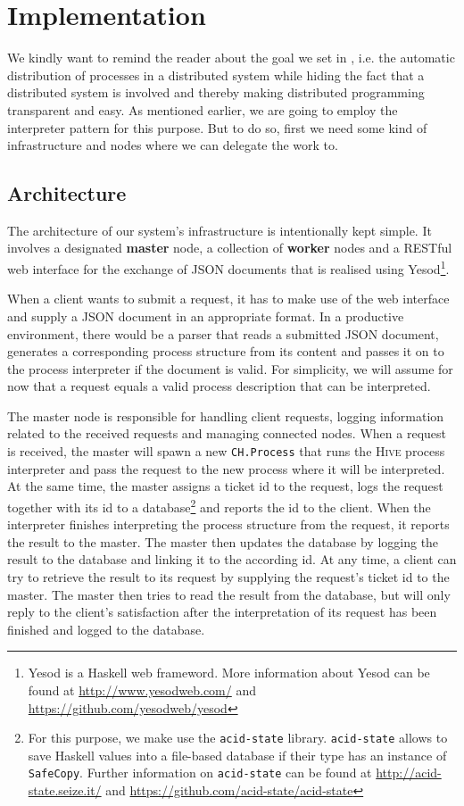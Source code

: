\section{Implementation}
\label{chp:implementation}
We kindly want to remind the reader about the goal we set in , i.e. the automatic distribution of processes in a distributed system while hiding the fact that a distributed system is involved and thereby making distributed programming transparent and easy. As mentioned earlier, we are going to employ the interpreter pattern \cite{Gamma:1995:DPE:186897} for this purpose. But to do so, first we need some kind of infrastructure and nodes where we can delegate the work to.

\subsection{Architecture}
The architecture of our system's infrastructure is intentionally kept simple. It involves a designated \textbf{master} node, a collection of \textbf{worker} nodes and a RESTful web interface for the exchange of JSON documents that is realised using Yesod\footnote{Yesod is a Haskell web frameword. More information about Yesod can be found at \url{http://www.yesodweb.com/} and \url{https://github.com/yesodweb/yesod}}.

When a client wants to submit a request, it has to make use of the web interface and supply a JSON document in an appropriate format. In a productive environment, there would be a parser that reads a submitted JSON document, generates a corresponding process structure from its content and passes it on to the process interpreter if the document is valid. For simplicity, we will assume for now that a request equals a valid process description that can be interpreted.

The master node is responsible for handling client requests, logging information related to the received requests and managing connected nodes. When a request is received, the master will spawn a new \texttt{CH.Process} that runs the \textsc{Hive} process interpreter and pass the request to the new process where it will be interpreted. At the same time, the master assigns a ticket id to the request, logs the request together with its id to a database\footnote{For this purpose, we make use the \texttt{acid-state} library. \texttt{acid-state} allows to save Haskell values into a file-based database if their type has an instance of \texttt{SafeCopy}. Further information on \texttt{acid-state} can be found at \url{http://acid-state.seize.it/} and \url{https://github.com/acid-state/acid-state}} and reports the id to the client. When the interpreter finishes interpreting the process structure from the request, it reports the result to the master. The master then updates the database by logging the result to the database and linking it to the according id. At any time, a client can try to retrieve the result to its request by supplying the request's ticket id to the master. The master then tries to read the result from the database, but will only reply to the client's satisfaction after the interpretation of its request has been finished and logged to the database.

